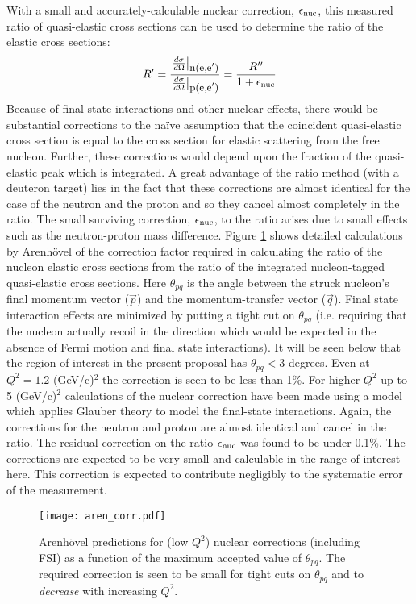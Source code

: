 \documentclass[12pt,letterpaper,oneside]{article}
\begin{document}
With a small and accurately-calculable nuclear correction,
$\epsilon_{\mbox{\scriptsize nuc}}$,  this measured ratio of quasi-elastic
cross sections can be used to determine the ratio of the elastic cross
sections:
$$ R'
=\frac{\left.\frac{d\sigma}{d\Omega}\right|_{\mbox{\small n(e,e$'$)}}
}{\left.\frac{d\sigma}{d\Omega}\right|_{\mbox{\small p(e,e$'$)}}}
=\frac{R''}{1+\epsilon_{\mbox{\scriptsize nuc}}}$$
Because of final-state interactions and other nuclear effects, there
would be substantial corrections to the na\"ive assumption that the 
coincident quasi-elastic cross section is equal to the cross section
for elastic scattering from the free nucleon.  Further, these
corrections would depend upon the fraction of the quasi-elastic peak
which is integrated.  A great advantage of the ratio method (with
a deuteron target) lies
in the fact that these corrections are almost identical for the case
of the neutron and the proton and so they cancel almost completely 
in the ratio.  The
small surviving correction, $\epsilon_{\mbox{\scriptsize nuc}}$, to the
ratio arises due to small effects such as the neutron-proton mass difference.
Figure \ref{aren_corr} shows detailed calculations\cite{Arenhovel} 
by Arenh\"ovel 
of the correction factor required in calculating the ratio of the nucleon 
elastic cross sections from the ratio of the integrated nucleon-tagged
quasi-elastic cross sections.  Here $\theta_{pq}$ is
the angle between the struck nucleon's final momentum vector
($\vec{p}$) and the momentum-transfer vector ($\vec{q}$). Final state
interaction effects are minimized by putting a tight cut on
$\theta_{pq}$ (i.e. requiring that the nucleon actually recoil in the
direction which would be expected in the absence of Fermi motion and
final state interactions).  It will be seen below that the region of
interest in the present proposal has $\theta_{pq}<3$ degrees.
Even at $Q^2=1.2$ (GeV/c)$^2$ the correction is seen to be less than
1\%.  For higher $Q^2$ up to 5 (GeV/c)$^2$ calculations of the nuclear
correction have been made \cite{Will,Jeff} using a model\cite{Jesch}
which applies Glauber theory to model the final-state interactions.  Again,
the corrections for the neutron and proton are almost identical and
cancel in the ratio.  The residual correction on the ratio 
$\epsilon_{\mbox{\scriptsize nuc}}$ was found to be under 0.1\%.  The
corrections are expected to be very small and calculable in the range
of interest here.  This correction is expected to contribute
negligibly to the systematic error of the measurement.


\begin{figure}
\begin{center}
\texttt{[image: aren\_corr.pdf]}\\
\end{center}
\caption{\label{aren_corr}
Arenh\"ovel predictions for (low $Q^2$) 
nuclear corrections (including FSI) as a function of the maximum
accepted value of $\theta_{pq}$.
The required
correction is seen to be small for tight cuts on $\theta_{pq}$ and to
{\em decrease} with increasing $Q^2$.}
\end{figure}
\end{document}
